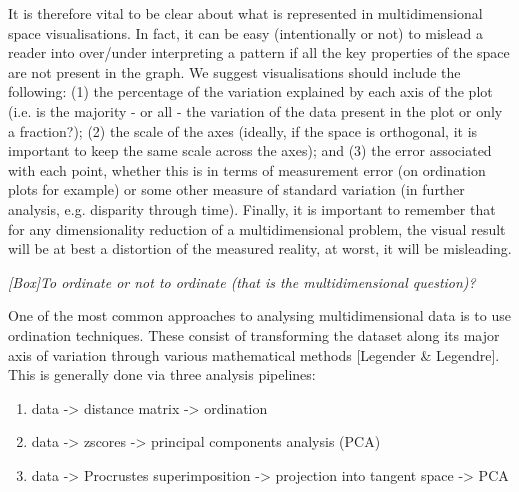 \documentclass[12pt,letterpaper]{article}
\renewcommand{\subsection}[1]{%
\bigskip
\begin{center}
\begin{large}
\normalfont\itshape #1
\end{large}
\end{center}}
\begin{document}
It is therefore vital to be clear about what is represented in multidimensional space visualisations.
In fact, it can be easy (intentionally or not) to mislead a reader into over/under interpreting a pattern if all the key properties of the space are not present in the graph.
We suggest visualisations should include the following:
(1) the percentage of the variation explained by each axis of the plot (i.e. is the majority - or all - the variation of the data present in the plot or only a fraction?);
(2) the scale of the axes (ideally, if the space is orthogonal, it is important to keep the same scale across the axes);
and (3) the error associated with each point, whether this is in terms of measurement error (on ordination plots for example) or some other measure of standard variation (in further analysis, e.g. disparity through time).
Finally, it is important to remember that for any dimensionality reduction of a multidimensional problem, the visual result will be at best a distortion of the measured reality, at worst, it will be misleading.

\subsection{[Box]To ordinate or not to ordinate (that is the multidimensional question)?}
\label{box_ordination}
One of the most common approaches to analysing multidimensional data is to use ordination techniques.
These consist of transforming the dataset along its major axis of variation through various mathematical methods [Legender \& Legendre].
This is generally done via three analysis pipelines:
\begin{enumerate}
    \item data -> distance matrix -> ordination
    \item data -> zscores -> principal components analysis (PCA)
    \item data -> Procrustes superimposition -> projection into tangent space -> PCA
\end{enumerate}
\end{document}

